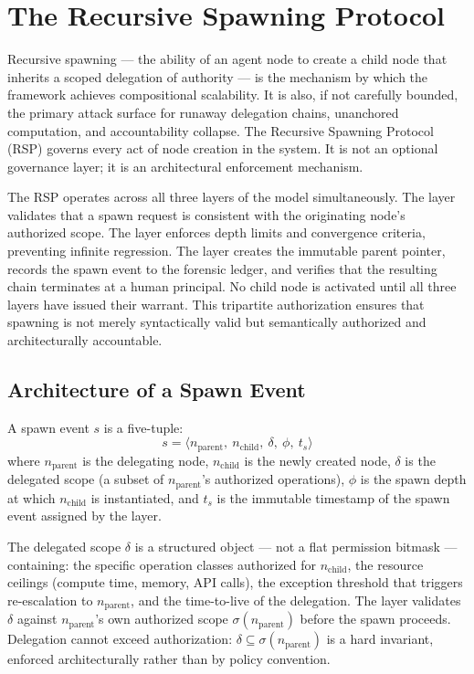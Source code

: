 \section{The Recursive Spawning Protocol}\label{sec:recursive-spawning}

Recursive spawning — the ability of an agent node to create a child node that inherits a scoped delegation of authority — is the mechanism by which the \bxthree{} framework achieves compositional scalability. It is also, if not carefully bounded, the primary attack surface for runaway delegation chains, unanchored computation, and accountability collapse. The Recursive Spawning Protocol (RSP) governs every act of node creation in the \bxthree{} system. It is not an optional governance layer; it is an architectural enforcement mechanism.

The RSP operates across all three layers of the \bxthree{} model simultaneously. The \purpose{} layer validates that a spawn request is consistent with the originating node's authorized scope. The \bounds{} layer enforces depth limits and convergence criteria, preventing infinite regression. The \fact{} layer creates the immutable parent pointer, records the spawn event to the forensic ledger, and verifies that the resulting chain terminates at a human principal. No child node is activated until all three layers have issued their warrant. This tripartite authorization ensures that spawning is not merely syntactically valid but semantically authorized and architecturally accountable.

\subsection{Architecture of a Spawn Event}\label{sec:spawn-architecture}

A spawn event $s$ is a five-tuple:
\begin{equation}
s = \langle n_{\text{parent}},\ n_{\text{child}},\ \delta,\ \phi,\ t_s \rangle
\end{equation}
where $n_{\text{parent}}$ is the delegating node, $n_{\text{child}}$ is the newly created node, $\delta$ is the delegated scope (a subset of $n_{\text{parent}}$'s authorized operations), $\phi$ is the spawn depth at which $n_{\text{child}}$ is instantiated, and $t_s$ is the immutable timestamp of the spawn event assigned by the \fact{} layer.

The delegated scope $\delta$ is a structured object — not a flat permission bitmask — containing: the specific operation classes authorized for $n_{\text{child}}$, the resource ceilings (compute time, memory, API calls), the exception threshold that triggers re-escalation to $n_{\text{parent}}$, and the time-to-live of the delegation. The \purpose{} layer validates $\delta$ against $n_{\text{parent}}$'s own authorized scope $\sigma(n_{\text{parent}})$ before the spawn proceeds. Delegation cannot exceed authorization: $\delta \subseteq \sigma(n_{\text{parent}})$ is a hard invariant, enforced architecturally rather than by policy convention.

